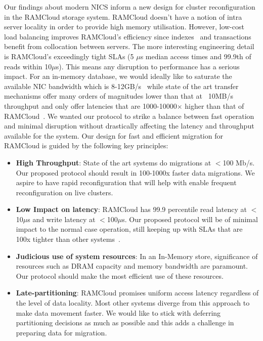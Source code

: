 Our findings about modern NICS inform a new design for cluster reconfiguration
in the RAMCloud storage system. RAMCloud doesn't have a notion of intra server locality 
in order to provide high memory utilisation. However, low-cost load balancing improves RAMCloud’s
efficiency since indexes~\cite{slik} and transactions~\cite{ramcloudtx} benefit from collocation between servers.
The more interesting engineering detail is RAMCloud’s exceedingly tight SLAs (5 $\mu$s median
access times and 99.9th of reads within 10$\mu$s). This means any disruption to performance
has a serious impact. For an in-memory database, we would ideally like to saturate the
available NIC bandwidth which is 8-12GB/s~\cite{cx3,cx4} while state of the art 
transfer mechanisms offer many orders of magnitudes lower than that at ~10MB/s 
throughput and only offer latencies that are 1000-10000$\times$ higher than that of RAMCloud~\cite{ramcloud}.
We wanted our protocol to strike a balance between fast operation and minimal disruption without drastically affecting
the latency and throughput available for the system. Our design for fast and efficient migration
for RAMCloud is guided by the following key principles:
\begin{itemize}
\item{\textbf{High Throughput}}: State of the art systems do migrations at $<$100 Mb/s. Our proposed protocol
should result in 100-1000x faster data migrations. We aspire to have rapid reconfiguration that will 
help with enable frequent reconfiguration on live clusters.
\item{\textbf{Low Impact on latency}}: RAMCloud has 99.9 percentile read latency at $<$10$\mu$s and write latency
at $<$100$\mu$s. Our proposed protocol will be of minimal impact to the normal case operation, still keeping
up with SLAs that are 100x tighter than other systems~\cite{squall}.
\item{\textbf{Judicious use of system resources}}: In an In-Memory store, significance of resources such as DRAM capacity and
memory bandwidth are paramount. Our protocol should make the most efficient use of these resources.
\item{\textbf{Late-partitioning}}: RAMCloud promises uniform access latency regardless of the level of data locality.
Most other systems diverge from this approach to make data movement faster. We would like to stick with
deferring partitioning decisions as much as possible and this adds a challenge in preparing data for migration.
\end{itemize}


